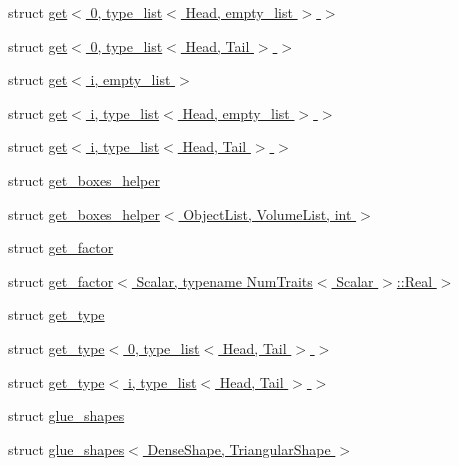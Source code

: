 \begin{DoxyCompactItemize}
struct \hyperlink{struct_eigen_1_1internal_1_1get_3_010_00_01type__list_3_01_head_00_01empty__list_01_4_01_4}{get$<$ 0, type\+\_\+list$<$ Head, empty\+\_\+list $>$ $>$}
\item 
struct \hyperlink{struct_eigen_1_1internal_1_1get_3_010_00_01type__list_3_01_head_00_01_tail_01_4_01_4}{get$<$ 0, type\+\_\+list$<$ Head, Tail $>$ $>$}
\item 
struct \hyperlink{struct_eigen_1_1internal_1_1get_3_01i_00_01empty__list_01_4}{get$<$ i, empty\+\_\+list $>$}
\item 
struct \hyperlink{struct_eigen_1_1internal_1_1get_3_01i_00_01type__list_3_01_head_00_01empty__list_01_4_01_4}{get$<$ i, type\+\_\+list$<$ Head, empty\+\_\+list $>$ $>$}
\item 
struct \hyperlink{struct_eigen_1_1internal_1_1get_3_01i_00_01type__list_3_01_head_00_01_tail_01_4_01_4}{get$<$ i, type\+\_\+list$<$ Head, Tail $>$ $>$}
\item 
struct \hyperlink{struct_eigen_1_1internal_1_1get__boxes__helper}{get\+\_\+boxes\+\_\+helper}
\item 
struct \hyperlink{struct_eigen_1_1internal_1_1get__boxes__helper_3_01_object_list_00_01_volume_list_00_01int_01_4}{get\+\_\+boxes\+\_\+helper$<$ Object\+List, Volume\+List, int $>$}
\item 
struct \hyperlink{struct_eigen_1_1internal_1_1get__factor}{get\+\_\+factor}
\item 
struct \hyperlink{struct_eigen_1_1internal_1_1get__factor_3_01_scalar_00_01typename_01_num_traits_3_01_scalar_01_4_1_1_real_01_4}{get\+\_\+factor$<$ Scalar, typename Num\+Traits$<$ Scalar $>$\+::\+Real $>$}
\item 
struct \hyperlink{struct_eigen_1_1internal_1_1get__type}{get\+\_\+type}
\item 
struct \hyperlink{struct_eigen_1_1internal_1_1get__type_3_010_00_01type__list_3_01_head_00_01_tail_01_4_01_4}{get\+\_\+type$<$ 0, type\+\_\+list$<$ Head, Tail $>$ $>$}
\item 
struct \hyperlink{struct_eigen_1_1internal_1_1get__type_3_01i_00_01type__list_3_01_head_00_01_tail_01_4_01_4}{get\+\_\+type$<$ i, type\+\_\+list$<$ Head, Tail $>$ $>$}
\item 
struct \hyperlink{struct_eigen_1_1internal_1_1glue__shapes}{glue\+\_\+shapes}
\item 
struct \hyperlink{struct_eigen_1_1internal_1_1glue__shapes_3_01_dense_shape_00_01_triangular_shape_01_4}{glue\+\_\+shapes$<$ Dense\+Shape, Triangular\+Shape $>$}
\item 

\end{DoxyCompactItemize}
